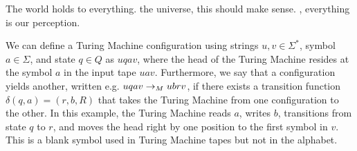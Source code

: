 \documentclass{article}
\begin{document}
\begin{solution}
    \par The world holds \WLOG to everything. \Wrt the universe, this should make sense. \Wlog, everything is  \wrt our perception.
    \par We can define a Turing Machine configuration using strings $u,v \in \Sigma^*$, symbol $a \in \Sigma$, and state $q \in Q$ as $uqav$, where the head of the Turing Machine resides at the symbol $a$ in the input tape $uav$. Furthermore, we say that a configuration yields another, written e.g. $uqav \rightarrow_M ubrv$, if there exists a transition function $\delta(q, a) = (r, b, R)$ that takes the Turing Machine from one configuration to the other. In this example, the Turing Machine reads $a$, writes $b$, transitions from state $q$ to $r$, and moves the head right by one position to the first symbol in $v$. This \blanksymbol is a blank symbol used in Turing Machine tapes but not in the alphabet.
\end{solution}
\end{document}
